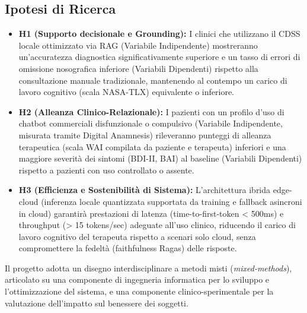 \documentclass[11pt,a4paper]{article}
\begin{document}
\subsection{Ipotesi di Ricerca}
\begin{itemize}
    \item \textbf{H1 (Supporto decisionale e Grounding):} I clinici che utilizzano il CDSS locale ottimizzato via RAG (Variabile Indipendente) mostreranno un'accuratezza diagnostica significativamente superiore e un tasso di errori di omissione nosografica inferiore (Variabili Dipendenti) rispetto alla consultazione manuale tradizionale, mantenendo al contempo un carico di lavoro cognitivo (scala NASA-TLX) equivalente o inferiore.
    \item \textbf{H2 (Alleanza Clinico-Relazionale):} I pazienti con un profilo d'uso di chatbot commerciali disfunzionale o compulsivo (Variabile Indipendente, misurata tramite Digital Anamnesis) rileveranno punteggi di alleanza terapeutica (scala WAI compilata da paziente e terapeuta) inferiori e una maggiore severità dei sintomi (BDI-II, BAI) al baseline (Variabili Dipendenti) rispetto a pazienti con uso controllato o assente.
    \item \textbf{H3 (Efficienza e Sostenibilità di Sistema):} L'architettura ibrida edge-cloud (inferenza locale quantizzata supportata da training e fallback asincroni in cloud) garantirà prestazioni di latenza (time-to-first-token < 500ms) e throughput (> 15 tokens/sec) adeguate all'uso clinico, riducendo il carico di lavoro cognitivo del terapeuta rispetto a scenari solo cloud, senza compromettere la fedeltà (faithfulness Ragas) delle risposte.
\end{itemize}


Il progetto adotta un disegno interdisciplinare a metodi misti (\textit{mixed-methods}), articolato su una componente di ingegneria informatica per lo sviluppo e l'ottimizzazione del sistema, e una componente clinico-sperimentale per la valutazione dell'impatto sul benessere dei soggetti.
\end{document}
